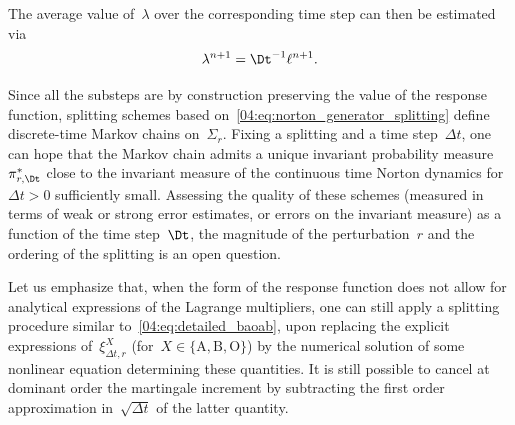 The average value of~$\lambda$ over the corresponding time step can then be estimated via
\begin{equation}
\label{04:eq:norton_discrete_forcing_estimator}
    \lambda^{n+1} = \Dt^{-1}\ell^{n+1}.
\end{equation}

Since all the substeps are by construction preserving the value of the response function, splitting schemes based on~\eqref{04:eq:norton_generator_splitting} define discrete-time Markov chains on~$\Sigma_r$. Fixing a splitting and a time step~$\Delta t$, one can hope that the Markov chain admits a unique invariant probability measure~$\pi^*_{r,\Dt}$ close to the invariant measure of the continuous time Norton dynamics for~$\Delta t>0$ sufficiently small. Assessing the quality of these schemes (measured in terms of weak or strong error estimates, or errors on the invariant measure) as a function of the time step~$\Dt$, the magnitude of the perturbation~$r$ and the ordering of the splitting is an open question.

\begin{remark}
Let us emphasize that, when the form of the response function does not allow for analytical expressions of the Lagrange multipliers, one can still apply a splitting procedure similar to~\eqref{04:eq:detailed_baoab}, upon replacing the explicit expressions of~$\xi_{\Delta t,r}^X$ (for~$X \in \{\mathrm{A},\mathrm{B},\mathrm{O}\}$) by the numerical solution of some nonlinear equation determining these quantities. It is still possible to cancel at dominant order the martingale increment by subtracting the first order approximation in~$\sqrt{\Delta t}$ of the latter quantity. 
\end{remark}

